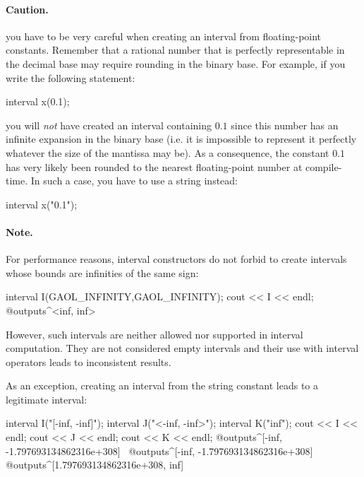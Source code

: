 \documentclass{manual}
\begin{document}
\paragraph{Caution.} you have to be very careful when creating an interval
from floating-point constants. Remember that a rational number that is
perfectly representable in the decimal base may require rounding in the
binary base. For example, if you write the following statement:

\begin{example}
  interval x(0.1);
\end{example}

\noindent
you will \emph{not} have created an interval containing $0.1$ since
this number has an infinite expansion in the binary base (i.e. it is
impossible to represent it perfectly whatever the size of the mantissa
may be). As a consequence, the constant $0.1$ has very likely
been rounded to the nearest floating-point number at compile-time.
In such a case, you have to use a string instead:

\begin{example}
interval x("0.1");
\end{example}

\paragraph{Note.}\label{par:inf_inf_note}
For performance reasons, interval constructors do not forbid to create intervals whose bounds are infinities of
the same sign:
\begin{example}
interval I(GAOL_INFINITY,GAOL_INFINITY);
cout << I << endl;
@outputs^<inf, inf>~
\end{example}
However, such intervals are neither allowed nor supported in interval computation. They are not considered empty intervals and their use with interval operators leads to inconsistent results.
%

As an exception, creating an interval from the  string constant leads to a legitimate interval:
\begin{example}
interval I("[-inf, -inf]");
interval J("<-inf, -inf>");
interval K("inf");
cout << I << endl;
cout << J << endl;
cout << K << endl;
@outputs^[-inf, -1.797693134862316e+308]~
@outputs^[-inf, -1.797693134862316e+308]~
@outputs^[1.797693134862316e+308, inf]~
\end{example}
\end{document}

